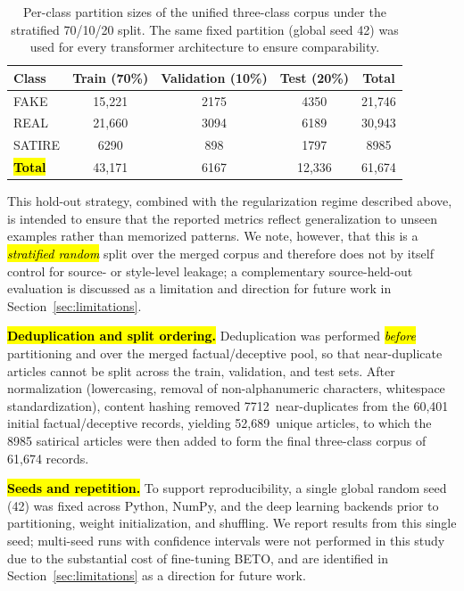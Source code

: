\documentclass[informatics,article,accept,pdftex,moreauthors]{Definitions/mdpi}
\begin{document}
\begin{table}[H]
\centering
\caption{Per-class partition sizes of the unified three-class corpus under the stratified 70/10/20 split. The same fixed partition (global seed 42) was used for every transformer architecture to ensure comparability.}
\label{tab:split_sizes}
\begin{tabularx}{\textwidth}{LCcCC}
\toprule
\textbf{Class} & \textbf{Train (70\%)} & \textbf{Validation (10\%)} & \textbf{Test (20\%)} & \textbf{Total} \\
\midrule
FAKE   & 15{,}221 & 2175 & 4350 & 21{,}746 \\
REAL   & 21{,}660 & 3094 & 6189 & 30{,}943 \\
SATIRE & 6290  & 898    & 1797 & 8985  \\
\midrule
\textbf{\hl{Total}} & 43{,}171 & 6167 & 12{,}336 & 61{,}674 \\
\bottomrule
\end{tabularx}
\end{table}

\vspace{-3pt}
This hold-out strategy, combined with the regularization regime described above, is intended to ensure that the reported metrics reflect generalization to unseen examples rather than memorized patterns. We note, however, that this is a \emph{\hl{stratified random}} split over the merged corpus and therefore does not by itself control for source- or style-level leakage; a complementary source-held-out evaluation is discussed as a limitation and direction for future work in Section~\ref{sec:limitations}.

\textbf{\hl{Deduplication and split ordering.}} Deduplication was performed \emph{\hl{before}} partitioning and over the merged factual/deceptive pool, so that near-duplicate articles cannot be split across the train, validation, and test sets. After normalization (lowercasing, removal of non-alphanumeric characters, whitespace standardization), content hashing removed \mbox{7712 near-duplicates} from the 60{,}401 initial factual/deceptive records, yielding \mbox{52{,}689 unique} articles, to which the 8985 satirical articles were then added to form the final three-class corpus of 61{,}674 records.

\textbf{\hl{Seeds and repetition.}} To support reproducibility, a single global random seed (42) was fixed across Python, NumPy, and the deep learning backends prior to partitioning, weight initialization, and shuffling. We report results from this single seed; multi-seed runs with confidence intervals were not performed in this study due to the substantial cost of fine-tuning BETO, and are identified in Section~\ref{sec:limitations} as a direction for future work.
\end{document}

